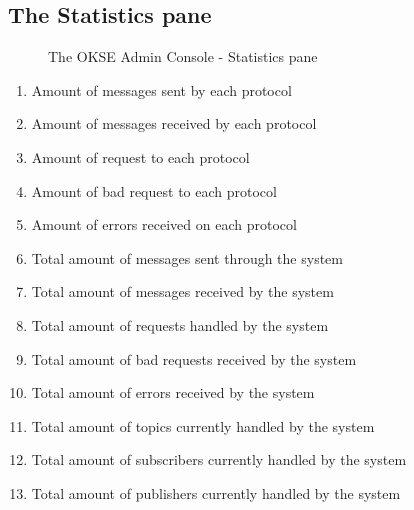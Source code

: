 \subsection{The Statistics pane}
\begin{center}
  \begin{figure}[ht!]
    \caption{The OKSE Admin Console - Statistics pane} 
    \label{fig:OKSE Admin Console - Statistics pane}
  \end{figure}
\end{center}
\begin{enumerate}
\item Amount of messages sent by each protocol
\item Amount of messages received by each protocol
\item Amount of request to each protocol
\item Amount of bad request to each protocol
\item Amount of errors received on each protocol
\item Total amount of messages sent through the system
\item Total amount of messages received by the system
\item Total amount of requests handled by the system
\item Total amount of bad requests received by the system
\item Total amount of errors received by the system
\item Total amount of topics currently handled by the system
\item Total amount of subscribers currently handled by the system
\item Total amount of publishers currently handled by the system
\end{enumerate}


